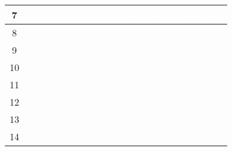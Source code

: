 \documentclass{article}
\begin{document}
\begin{center}
\begin{tabular}{|c|c|c|c|c|c|c|c|}
7 & \cellcolor{rojo}\textcolor{white}{0} & \cellcolor{verde}\textcolor{white}{6(1)} & \cellcolor{rojo}\textcolor{white}{6} & \cellcolor{rojo}\textcolor{white}{6} & \cellcolor{rojo}\textcolor{white}{6} & \cellcolor{verde}\textcolor{white}{51(3)} & \cellcolor{rojo}\textcolor{white}{51} \\ \hline
8 & \cellcolor{rojo}\textcolor{white}{0} & \cellcolor{verde}\textcolor{white}{6(1)} & \cellcolor{verde}\textcolor{white}{10(1)} & \cellcolor{rojo}\textcolor{white}{10} & \cellcolor{rojo}\textcolor{white}{10} & \cellcolor{verde}\textcolor{white}{68(4)} & \cellcolor{rojo}\textcolor{white}{68} \\ \hline
9 & \cellcolor{rojo}\textcolor{white}{0} & \cellcolor{verde}\textcolor{white}{6(1)} & \cellcolor{verde}\textcolor{white}{10(1)} & \cellcolor{verde}\textcolor{white}{11(1)} & \cellcolor{rojo}\textcolor{white}{11} & \cellcolor{verde}\textcolor{white}{68(4)} & \cellcolor{rojo}\textcolor{white}{68} \\ \hline
10 & \cellcolor{rojo}\textcolor{white}{0} & \cellcolor{verde}\textcolor{white}{6(1)} & \cellcolor{verde}\textcolor{white}{10(1)} & \cellcolor{verde}\textcolor{white}{11(1)} & \cellcolor{rojo}\textcolor{white}{11} & \cellcolor{verde}\textcolor{white}{85(5)} & \cellcolor{rojo}\textcolor{white}{85} \\ \hline
11 & \cellcolor{rojo}\textcolor{white}{0} & \cellcolor{verde}\textcolor{white}{6(1)} & \cellcolor{verde}\textcolor{white}{10(1)} & \cellcolor{verde}\textcolor{white}{11(1)} & \cellcolor{rojo}\textcolor{white}{11} & \cellcolor{verde}\textcolor{white}{85(5)} & \cellcolor{rojo}\textcolor{white}{85} \\ \hline
12 & \cellcolor{verde}\textcolor{white}{15(1)} & \cellcolor{rojo}\textcolor{white}{15} & \cellcolor{rojo}\textcolor{white}{15} & \cellcolor{rojo}\textcolor{white}{15} & \cellcolor{rojo}\textcolor{white}{15} & \cellcolor{verde}\textcolor{white}{102(6)} & \cellcolor{rojo}\textcolor{white}{102} \\ \hline
13 & \cellcolor{verde}\textcolor{white}{15(1)} & \cellcolor{rojo}\textcolor{white}{15} & \cellcolor{rojo}\textcolor{white}{15} & \cellcolor{rojo}\textcolor{white}{15} & \cellcolor{rojo}\textcolor{white}{15} & \cellcolor{verde}\textcolor{white}{102(6)} & \cellcolor{rojo}\textcolor{white}{102} \\ \hline
14 & \cellcolor{verde}\textcolor{white}{15(1)} & \cellcolor{rojo}\textcolor{white}{15} & \cellcolor{rojo}\textcolor{white}{15} & \cellcolor{rojo}\textcolor{white}{15} & \cellcolor{rojo}\textcolor{white}{15} & \cellcolor{verde}\textcolor{white}{119(7)} & \cellcolor{rojo}\textcolor{white}{119} \\ \hline

\end{tabular}
\end{center}
\end{document}

